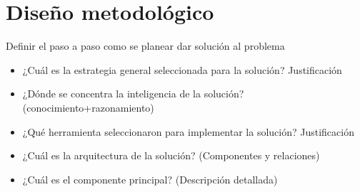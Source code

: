 \section{Diseño metodológico}

\begin{tcolorbox}[colback=yellow!10!white,colframe=red!75!black,title=Recomendaciones]
Definir el paso a paso como se planear dar solución al problema
  \begin{itemize}
      \item ¿Cuál es la estrategia general seleccionada para la solución? Justificación
      \item ¿Dónde se concentra la inteligencia de la solución? (conocimiento+razonamiento) 
      \item ¿Qué herramienta seleccionaron para implementar la solución? Justificación
      \item ¿Cuál es la arquitectura de la solución? (Componentes y relaciones)
      \item ¿Cuál es el componente principal? (Descripción detallada)
  \end{itemize}
\end{tcolorbox}

\pagebreak